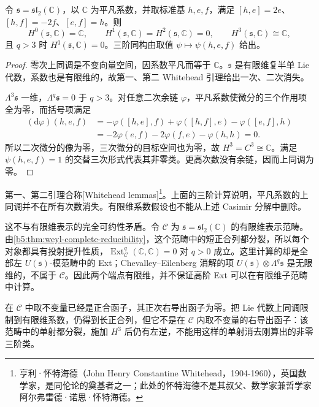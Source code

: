 \begin{proposition}\label{b5:prop:sl2-trivial-cohomology}
	令 \(\mathfrak s=\mathfrak{sl}_2(\mathbb C)\)，以 \(\mathbb C\) 为平凡系数，并取标准基 \(h,e,f\)，满足 \([h,e]=2e\)、\([h,f]=-2f\)、\([e,f]=h\)。则
	\[
		H^0(\mathfrak s,\mathbb C)=\mathbb C,\qquad H^1(\mathfrak s,\mathbb C)=H^2(\mathfrak s,\mathbb C)=0,\qquad H^3(\mathfrak s,\mathbb C)\cong\mathbb C,
	\]
	且 \(q>3\) 时 \(H^q(\mathfrak s,\mathbb C)=0\)。三阶同构由取值 \(\psi\mapsto\psi(h,e,f)\) 给出。
\end{proposition}
\begin{proof}
	零次上同调是不变向量空间，因系数平凡而等于 \(\mathbb C\)。\(\mathfrak s\) 是有限维复半单 Lie 代数，系数也是有限维的，故第一、第二 Whitehead 引理给出一次、二次消失。

	\(\Lambda^3\mathfrak s\) 一维，\(\Lambda^q\mathfrak s=0\) 于 \(q>3\)。对任意二次余链 \(\varphi\)，平凡系数使微分的三个作用项全为零，而括号项满足
	\begin{align*}
		(\mathrm{d}\varphi)(h,e,f) &=-\varphi([h,e],f)+\varphi([h,f],e)-\varphi([e,f],h)\\
		&=-2\varphi(e,f)-2\varphi(f,e)-\varphi(h,h)=0.
	\end{align*}
	所以二次微分的像为零，三次微分的目标空间也为零，故 \(H^3=C^3\cong\mathbb C\)。满足 \(\psi(h,e,f)=1\) 的交替三次形式代表其非零类。更高次数没有余链，因而上同调为零。
\end{proof}

第一、第二引理合称[Whitehead lemmas]\footnote{亨利·怀特海德（John Henry Constantine Whitehead，1904-1960），英国数学家，是同伦论的奠基者之一；此处的怀特海德不是其叔父、数学家兼哲学家阿尔弗雷德·诺思·怀特海德。}。上面的三阶计算说明，平凡系数的上同调并不在所有次数消失。有限维系数假设也不能从上述 Casimir 分解中删除。

\ProseParagraphBreak

这不与有限维表示的完全可约性矛盾。令 \(\mathcal C\) 为 \(\mathfrak s=\mathfrak{sl}_2(\mathbb C)\) 的有限维表示范畴。由\cref{b5:thm:weyl-complete-reducibility}，这个范畴中的短正合列都分裂，所以每个对象都具有投射提升性质，\(\operatorname{Ext}_{\mathcal C}^q(\mathbb C,\mathbb C)=0\) 对 \(q>0\) 成立。这里计算的却是全部左 \(U(\mathfrak s)\)-模范畴中的 Ext；Chevalley--Eilenberg 消解的项 \(U(\mathfrak s)\otimes\Lambda^q\mathfrak s\) 是无限维的，不属于 \(\mathcal C\)。因此两个端点有限维，并不保证高阶 Ext 可以在有限维子范畴中计算。

\ProseParagraphBreak
在 \(\mathcal C\) 中取不变量已经是正合函子，其正次右导出函子为零。把 Lie 代数上同调限制到有限维系数，仍得到长正合列，但它不是在 \(\mathcal C\) 内取不变量的右导出函子：该范畴中的单射都分裂，施加 \(H^3\) 后仍有左逆，不能用这样的单射消去刚算出的非零三阶类。


